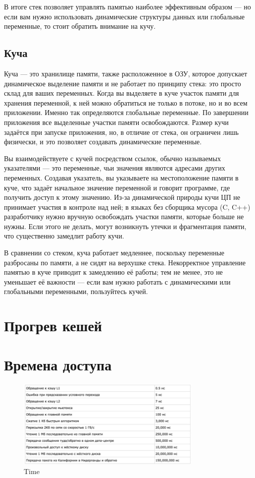 В итоге стек позволяет управлять памятью наиболее эффективным образом — но если вам нужно использовать динамические структуры данных или глобальные переменные, то стоит обратить внимание на кучу.

\subsection{Куча}

Куча — это хранилище памяти, также расположенное в ОЗУ, которое допускает динамическое выделение памяти и не работает по принципу стека: это просто склад для ваших переменных. Когда вы выделяете в куче участок памяти для хранения переменной, к ней можно обратиться не только в потоке, но и во всем приложении. Именно так определяются глобальные переменные. По завершении приложения все выделенные участки памяти освобождаются. Размер кучи задаётся при запуске приложения, но, в отличие от стека, он ограничен лишь физически, и это позволяет создавать динамические переменные.

Вы взаимодействуете с кучей посредством ссылок, обычно называемых указателями — это переменные, чьи значения являются адресами других переменных. Создавая указатель, вы указываете на местоположение памяти в куче, что задаёт начальное значение переменной и говорит программе, где получить доступ к этому значению. Из-за динамической природы кучи ЦП не принимает участия в контроле над ней; в языках без сборщика мусора (C, C++) разработчику нужно вручную освобождать участки памяти, которые больше не нужны. Если этого не делать, могут возникнуть утечки и фрагментация памяти, что существенно замедлит работу кучи.

В сравнении со стеком, куча работает медленнее, поскольку переменные разбросаны по памяти, а не сидят на верхушке стека. Некорректное управление памятью в куче приводит к замедлению её работы; тем не менее, это не уменьшает её важности — если вам нужно работать с динамическими или глобальными переменными, пользуйтесь кучей.

\section{Прогрев кешей}

\section{Времена доступа}

\begin{figure}[h!]
\centering
\includegraphics[width=0.8\textwidth]{time}
\caption{Time}
\label{time}
\end{figure}